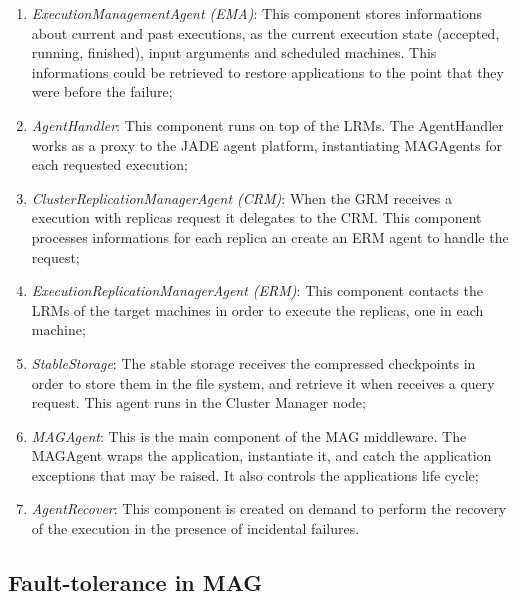 \documentclass[times, 09pt, twocolumn]{article}
\begin{document}
\begin{enumerate}

    \item \emph{ExecutionManagementAgent (EMA)}: This component stores
    informations about current and past executions, as the current execution state
    (accepted, running, finished), input arguments and scheduled machines. This informations
    could be retrieved to restore applications to the point that they were before
    the failure;

    \item \emph{AgentHandler}: This component runs on top of the LRMs. The
    AgentHandler works as a proxy to the JADE agent platform, instantiating
    MAGAgents for each requested execution;

    \item \emph{ClusterReplicationManagerAgent (CRM)}: When the GRM receives a
    execution with replicas request it delegates to the CRM. This component
    processes informations for each replica an create an ERM agent to handle the
    request;

    \item \emph{ExecutionReplicationManagerAgent (ERM)}: This component
    contacts the LRMs of the target machines in order to execute the replicas, one
    in each machine;

    \item \emph{StableStorage}: The stable storage receives the compressed
    checkpoints in order to store them in the file system, and retrieve it when
    receives a query request. This agent runs in the Cluster Manager node;

    \item \emph{MAGAgent}: This is the main component of the MAG middleware.
    The MAGAgent wraps the application, instantiate it, and catch the application
    exceptions that may be raised. It also controls the applications life cycle;

    \item \emph{AgentRecover}: This component is created on demand to perform
    the recovery of the execution in the presence of incidental failures.

\end{enumerate}

\subsection{Fault-tolerance in MAG\label{sec:faulttolerance}}
\end{document}
